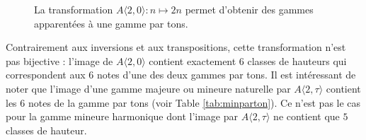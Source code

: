\documentclass{article}
\DeclareRobustCommand{\svdots}{%
  \vcenter{%
    \offinterlineskip
    \hbox{.}
    \vskip0.25\normalbaselineskip
    \hbox{.}
    \vskip0.25\normalbaselineskip
    \hbox{.}%
  }%
}
\begin{document}
\begin{figure}[htbp]
  \centering
  \caption{La transformation $A\langle 2,0\rangle :n\mapsto 2n$ permet d'obtenir des gammes apparentées à une gamme par tons.\label{fig:gammepartons}}
\end{figure}

Contrairement aux inversions et aux transpositions, cette transformation n'est pas bijective : l'image de $A\langle 2,0 \rangle$ con\-tient exactement $6$ classes de hauteurs qui correspondent aux $6$ notes d'une des deux gammes par tons. Il est intéressant de noter que l'image d'une gamme majeure ou mineure naturelle par $A\langle 2,\tau\rangle$ contient les $6$ notes de la gamme par tons (voir Table \ref{tab:minparton}). Ce n'est pas le cas pour la gamme mineure harmonique dont l'image par $A\langle 2,\tau\rangle$ ne contient que $5$ classes de hauteur.
\end{document}
